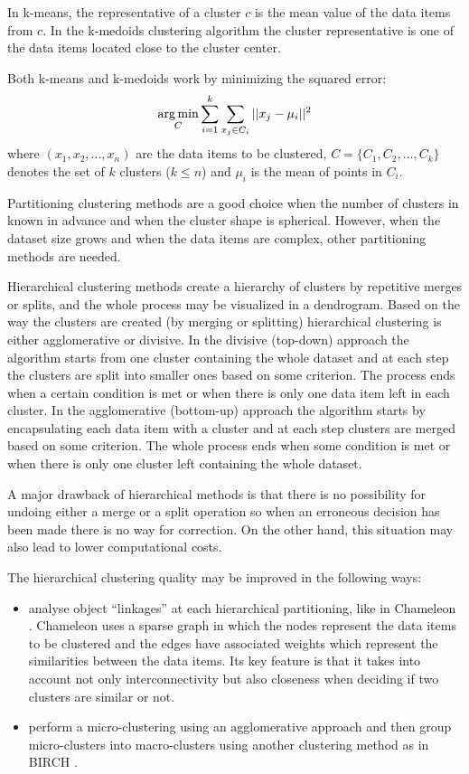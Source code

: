 In k-means, the representative of a cluster $c$ is the mean value of the data items from $c$.  In the k-medoids clustering algorithm the cluster representative is one of the data items located close to the cluster center.

Both k-means and k-medoids work by minimizing the squared error:
\[
\operatorname*{arg\,min}_C \sum_{i=1}^{k} \sum_{x_j \in C_i} || x_j - \mu_i ||^{2}
\]
where $(x_1, x_2, ..., x_n)$ are the data items to be clustered, $C = \{C_1, C_2, ..., C_k\}$ denotes the set of $k$ clusters ($k \leq n$) and $\mu_i$ is the mean of points in $C_i$.

Partitioning clustering methods are a good choice when the number of clusters in known in advance and when the cluster shape is spherical. However, when the dataset size grows and when the data items are complex, other partitioning methods are needed.

Hierarchical clustering methods create a hierarchy of clusters by repetitive merges or splits, and the whole process may be visualized in a dendrogram. Based on the way the clusters are created (by merging or splitting) hierarchical clustering is either agglomerative or divisive. In the divisive (top-down) approach the algorithm starts from one cluster containing the whole dataset and at each step the clusters are split into smaller ones based on some criterion. The process ends when a certain condition is met or when there is only one data item left in each cluster. In the agglomerative (bottom-up) approach the algorithm starts by encapsulating each data item with a cluster and at each step clusters are merged based on some criterion. The whole process ends when some condition is met or when there is only one cluster left containing the whole dataset.

A major drawback of hierarchical methods is that there is no possibility for undoing either a merge or a split operation so when an erroneous decision has been made there is no way for correction. On the other hand, this situation may also lead to lower computational costs.

The hierarchical clustering quality may be improved in  the following ways:
\begin{itemize}
\item analyse object ``linkages'' at each hierarchical partitioning, like in Chameleon \cite{Karypis99Chameleon}. Chameleon uses a sparse graph in which the nodes represent the data items to be clustered and the edges have associated weights which represent the similarities between the data items. Its key feature is that it takes into account not only interconnectivity but also closeness when deciding if two clusters are similar or not.
\item perform a micro-clustering using an agglomerative approach and then group micro-clusters into macro-clusters  using another clustering method as in BIRCH \cite{Zhang97BIRCH}. 
\end{itemize}


